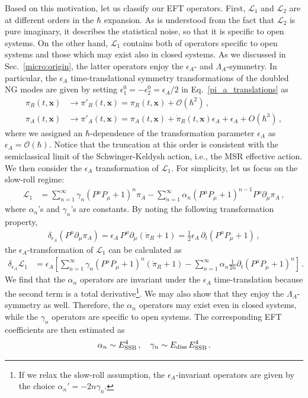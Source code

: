 \documentclass[a4paper,11pt]{article}
\begin{document}
\medskip
Based on this motivation, let us classify our EFT operators. First, $\mathcal{L}_1$ and $\mathcal{L}_2$ are at different orders in the $\hbar$ expansion. As is understood from the fact that $\mathcal{L}_2$ is pure imaginary, it describes the statistical noise, so that it is specific to open systems.
On the other hand, $\mathcal{L}_1$ contains both of operators specific to open systems and those which may exist also in closed systems. As we discussed in Sec.~\ref{micro:origin}, the latter operators enjoy the $\epsilon_A$- and $\Lambda_A$-symmetry. In particular, the $\epsilon_A$ time-translational symmetry transformations of the doubled NG modes are given by setting $\epsilon^0_1=-\epsilon^0_2=\epsilon_A/2$ in Eq.~\eqref{pi_a_translations} as
\begin{align}
\label{epsilon_A_R}
 \pi_R(t,\mathbf{x})&\to 
 \pi'_R(t,\mathbf{x}) 
 = \pi_R(t,\mathbf{x}) 
 +\mathcal{O}(\hbar^2)\,,
 \\
\label{epsilon_A_A}
 \pi_A(t,\mathbf{x})&\to 
 \pi'_A(t,\mathbf{x})
 =\pi_A(t,\mathbf{x})+\dot{\pi}_R(t,\mathbf{x})\epsilon_A+\epsilon_A+ O(\hbar^3)\,,
\end{align}
where we assigned an $\hbar$-dependence of the transformation parameter $\epsilon_A$ as $\epsilon_A=\mathcal{O}(\hbar)$. Notice that the truncation at this order is consistent with the semiclassical limit of the Schwinger-Keldysh action,
i.e., the MSR effective action.
We then consider the $\epsilon_A$ transformation of $\mathcal{L}_1$. For simplicity, let us focus on the slow-roll regime:
\begin{align}
\mathcal{L}_1&=
\sum_{n=1}^\infty\gamma_n(P^\mu P_\mu+1)^n\pi_A
-\sum_{n=1}^\infty\alpha_n(P^\mu P_\mu+1)^{n-1}P^\mu\partial_\mu\pi_A
\,,
\end{align}
where $\alpha_n$'s and $\gamma_n$'s are constants. 
By noting the following transformation property,
\begin{align}
\delta_{\epsilon_A} (P^\mu\partial_\mu\pi_A)=\epsilon_A\,P^\mu\partial_\mu(\dot{\pi}_R+1)=\frac{1}{2}\epsilon_A\,\partial_t(P^\mu P_\mu+1)\,,
\end{align}
the $\epsilon_A$-transformation of $\mathcal{L}_1$ can be calculated as
\begin{align}
\delta_{\epsilon_A} \mathcal{L}_1&=
\epsilon_A\left[
\sum_{n=1}^\infty\gamma_n(P^\mu P_\mu+1)^n(\dot{\pi}_R+1)
-\sum_{n=1}^\infty\alpha_n\frac{1}{2n}\partial_t(P^\mu P_\mu+1)^{n}
\right]
\,.
\end{align}
We find that the $\alpha_n$ operators are invariant under the $\epsilon_A$ time-translation because the second term is a total derivative\footnote{
\label{footnote:non-slow_roll}
If we relax the slow-roll assumption, the $\epsilon_A$-invariant operators are given by the choice $\alpha_n'= - 2n\gamma_n$.}. We may also show that they enjoy the $\Lambda_A$-symmetry as well. Therefore, the $\alpha_n$ operators may exist even in closed systems, while the $\gamma_n$ operators are specific to open systems. The corresponding EFT coefficients are then estimated as
\begin{align}
\alpha_n\sim E_{\rm SSB}^4\,,
\quad
\gamma_n\sim E_{\rm diss}\,E_{\rm SSB}^4\,.
\end{align}
\end{document}
